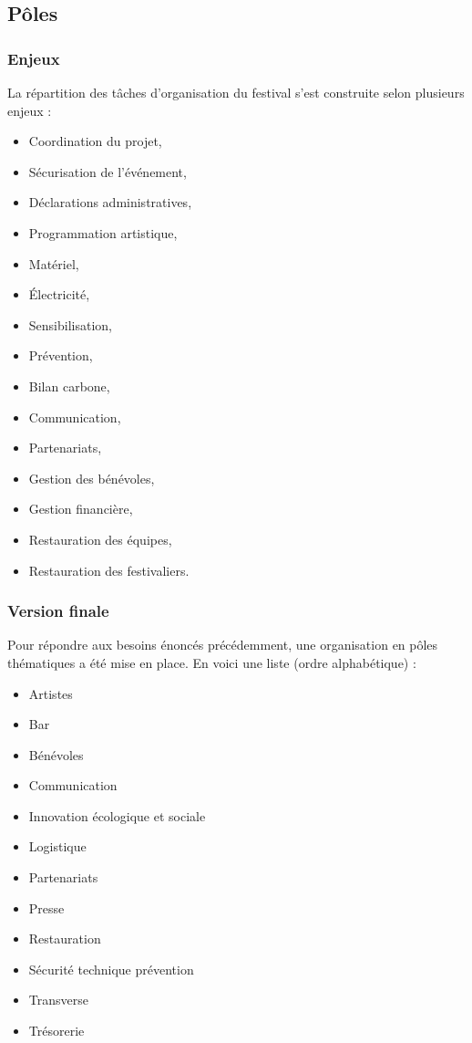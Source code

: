 \documentclass[12pt,a4paper]{report}
\begin{document}
\subsection{Pôles}
\subsubsection{Enjeux}
La répartition des tâches d'organisation du festival s'est construite selon plusieurs enjeux :
\begin{itemize}
\item Coordination du projet,
\item Sécurisation de l'événement,
\item Déclarations administratives,
\item Programmation artistique,
\item Matériel,
\item Électricité,
\item Sensibilisation,
\item Prévention,
\item Bilan carbone,
\item Communication,
\item Partenariats,
\item Gestion des bénévoles,
\item Gestion financière,
\item Restauration des équipes,
\item Restauration des festivaliers. \\
\end{itemize}

\subsubsection{Version finale}
Pour répondre aux besoins énoncés précédemment, une organisation en pôles thématiques a été mise en place. En voici une liste (ordre alphabétique) : 
\begin{itemize}
\item Artistes
\item Bar
\item Bénévoles
\item Communication
\item Innovation écologique et sociale
\item Logistique
\item Partenariats
\item Presse
\item Restauration
\item Sécurité technique prévention
\item Transverse
\item Trésorerie
\end{itemize}
\end{document}
